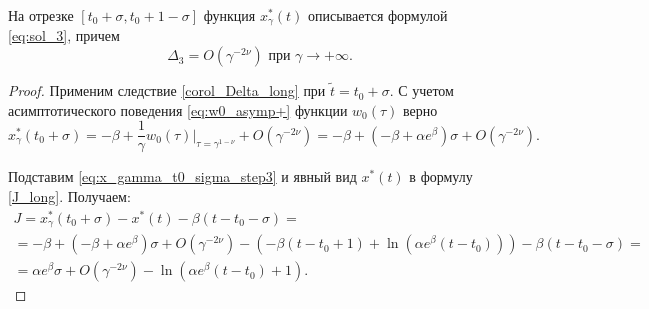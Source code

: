 \begin{lemma}
	\label{lm:Delta3}
	На отрезке $[t_0 + \sigma, t_0 + 1 - \sigma]$ функция $x_\gamma^*(t)$ описывается формулой \eqref{eq:sol_3}, причем
	\[
	\Delta_3 = O(\gamma^{-2\nu}) \text{ при } \gamma \to +\infty.
	\]
\end{lemma}
\begin{proof}
Применим следствие \ref{corol_Delta_long} при $\tilde{t} = t_0 + \sigma$. С учетом асимптотического поведения \eqref{eq:w0_asymp+} функции $w_0(\tau)$ верно
\begin{equation}
\label{eq:x_gamma_t0_sigma_step3}
	x_\gamma^*(t_0 + \sigma) = -\beta + \frac{1}{\gamma} w_0(\tau)|_{\tau=\gamma^{1 - \nu}} + O(\gamma^{-2\nu}) = -\beta + (-\beta + \alpha e^\beta)\sigma + O(\gamma^{-2\nu}).
\end{equation}

Подставим \eqref{eq:x_gamma_t0_sigma_step3} и явный вид $x^*(t)$ в формулу \eqref{J_long}. Получаем:
\begin{multline}
	\label{J_step3}
	J = x_\gamma^*(t_0 + \sigma) - x^*(t) - \beta(t - t_0 - \sigma) =\\
	= -\beta + (-\beta + \alpha e^\beta)\sigma + O(\gamma^{-2\nu}) - 
	(-\beta(t - t_0 + 1) + \ln(\alpha e^{\beta}(t - t_0))) - \beta (t - t_0 - \sigma) = \\
	 =\alpha e^\beta\sigma + O(\gamma^{-2\nu}) - \ln(\alpha e^{\beta}(t - t_0) + 1).
\end{multline}


\end{proof}
